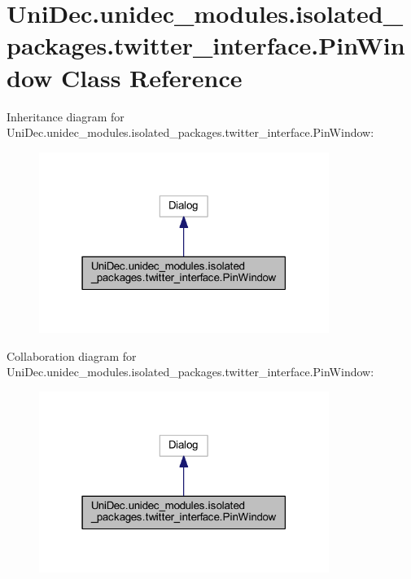\hypertarget{class_uni_dec_1_1unidec__modules_1_1isolated__packages_1_1twitter__interface_1_1_pin_window}{}\section{Uni\+Dec.\+unidec\+\_\+modules.\+isolated\+\_\+packages.\+twitter\+\_\+interface.\+Pin\+Window Class Reference}
\label{class_uni_dec_1_1unidec__modules_1_1isolated__packages_1_1twitter__interface_1_1_pin_window}


Inheritance diagram for Uni\+Dec.\+unidec\+\_\+modules.\+isolated\+\_\+packages.\+twitter\+\_\+interface.\+Pin\+Window\+:\nopagebreak
\begin{figure}[H]
\begin{center}
\leavevmode
\includegraphics[width=267pt]{class_uni_dec_1_1unidec__modules_1_1isolated__packages_1_1twitter__interface_1_1_pin_window__inherit__graph}
\end{center}
\end{figure}


Collaboration diagram for Uni\+Dec.\+unidec\+\_\+modules.\+isolated\+\_\+packages.\+twitter\+\_\+interface.\+Pin\+Window\+:\nopagebreak
\begin{figure}[H]
\begin{center}
\leavevmode
\includegraphics[width=267pt]{class_uni_dec_1_1unidec__modules_1_1isolated__packages_1_1twitter__interface_1_1_pin_window__coll__graph}
\end{center}
\end{figure}
